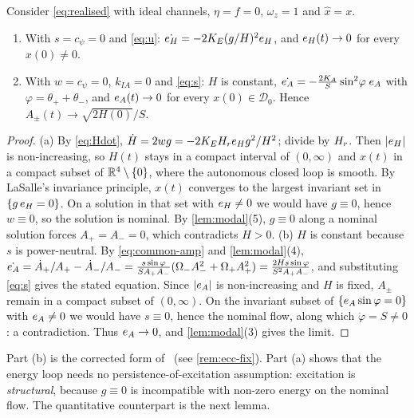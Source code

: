 \begin{proposition}\label{prop:ideal}
Consider \eqref{eq:realised} with ideal channels, $\eta=f=0$, $\omega_z=1$ and
$\hat x=x$.
\begin{enumerate}
\item[(a)] With $s=c_\psi=0$ and \eqref{eq:u}: $\dot{e_H}=-2K_E(g/H)^2e_H$, and
  $e_H(t)\to0$ for every $x(0)\neq0$.
\item[(b)] With $w=c_\psi=0$, $k_{IA}=0$ and \eqref{eq:s}: $H$ is constant,
  $\dot{e_A}=-\tfrac{2K_A}{S}\sin^2\!\varphi\;e_A$ with $\varphi=\theta_++\theta_-$,
  and $e_A(t)\to0$ for every $x(0)\in\mathcal D_0$.
  Hence $A_\pm(t)\to\sqrt{2H(0)}/S$.
\end{enumerate}
\end{proposition}
\begin{proof}
(a) By \eqref{eq:Hdot}, $\dot H=2wg=-2K_EH_re_H g^2/H^2$; divide by $H_r$.
Then $|e_H|$ is non-increasing, so $H(t)$ stays in a compact interval of
$(0,\infty)$ and $x(t)$ in a compact subset of $\mathbb{R}^4\setminus\{0\}$, where the
autonomous closed loop is smooth.
By LaSalle's invariance principle, $x(t)$ converges to the largest invariant set
in $\{g\,e_H=0\}$.
On a solution in that set with $e_H\neq0$ we would have $g\equiv0$, hence $w\equiv0$,
so the solution is nominal.
By \cref{lem:modal}(5), $g\equiv0$ along a nominal solution forces
$A_+=A_-=0$, which contradicts $H>0$.
(b) $H$ is constant because $s$ is power-neutral.
By \eqref{eq:common-amp} and \cref{lem:modal}(4),
$\dot{e_A}=\dot A_+/A_+-\dot A_-/A_-=\frac{s\sin\varphi}{SA_+A_-}(\Omega_-
A_-^2+\Omega_+ A_+^2)=\frac{2Hs\sin\varphi}{S^2A_+A_-}$, and substituting
\eqref{eq:s} gives the stated equation.
Since $|e_A|$ is non-increasing and $H$ is fixed, $A_\pm$ remain in a compact
subset of $(0,\infty)$.
On the invariant subset of $\{e_A\sin\varphi=0\}$ with $e_A\ne0$ we would have
$s\equiv0$, hence the nominal flow, along which $\dot\varphi=S\neq0$: a
contradiction.
Thus $e_A\to0$, and \cref{lem:modal}(3) gives the limit.
\end{proof}

Part (b) is the corrected form of~\citet[Prop.~2]{juchem2027restoring}
(see \cref{rem:ecc-fix}).
Part (a) shows that the energy loop needs no persistence-of-excitation
assumption: excitation is \emph{structural}, because $g\equiv0$ is incompatible
with non-zero energy on the nominal flow.
The quantitative counterpart is the next lemma.

